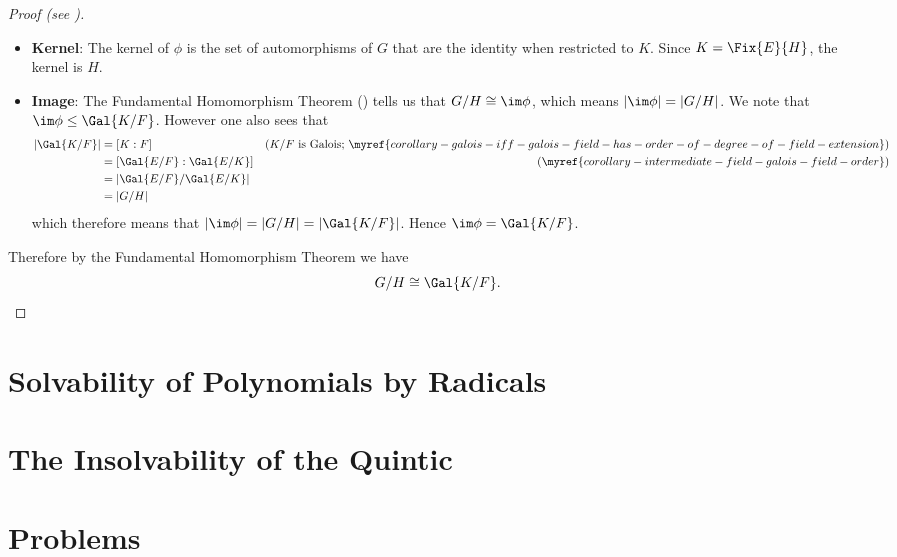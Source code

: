 \begin{proof}[Proof (see {\cite[Theorem 23.23, Statment 4]{judson_beezer_2022}})]
\begin{itemize}
        \item \textbf{Kernel}: The kernel of $\phi$ is the set of automorphisms of $G$ that are the identity when restricted to $K$. Since $K = \Fix{E}{H}$, the kernel is $H$.
        
        \item \textbf{Image}: The Fundamental Homomorphism Theorem () tells us that $G/H \cong \im\phi$, which means $|\im\phi| = |G/H|$. We note that $\im\phi \leq \Gal{K/F}$. However one also sees that
        \begin{align*}
            |\Gal{K/F}| &= [K:F] & (K/F \text{ is Galois; } \myref{corollary-galois-iff-galois-field-has-order-of-degree-of-field-extension})\\
            &= [\Gal{E/F}:\Gal{E/K}] & (\myref{corollary-intermediate-field-galois-field-order})\\
            &= |\Gal{E/F}/\Gal{E/K}|\\
            &= |G/H|
        \end{align*}
        which therefore means that $|\im\phi| = |G/H| = |\Gal{K/F}|$. Hence $\im\phi = \Gal{K/F}$.
    \end{itemize}
    Therefore by the Fundamental Homomorphism Theorem we have
    \[
        G/H \cong \Gal{K/F}.\qedhere
    \]
\end{proof}

\section{Solvability of Polynomials by Radicals}

\section{The Insolvability of the Quintic}

\newpage

\section{Problems}
